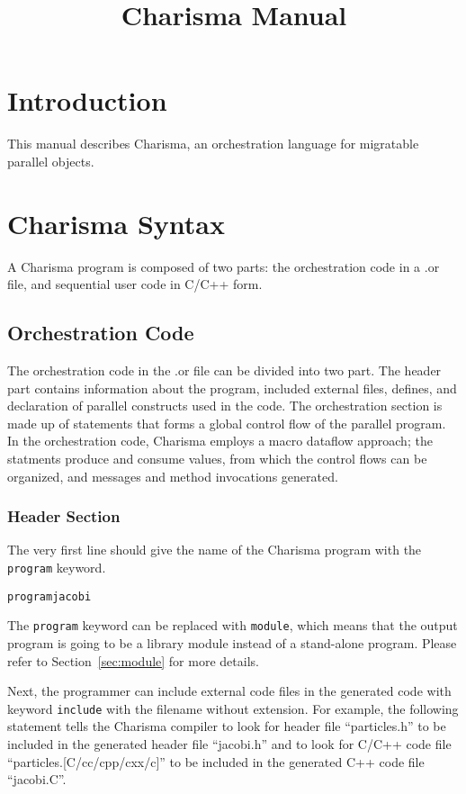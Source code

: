 \documentclass[10pt]{article}
\title{Charisma Manual}
\begin{document}
\maketitle

\section{Introduction}

This manual describes Charisma, an orchestration language for migratable
parallel objects. 

\section{Charisma Syntax}
A Charisma program is composed of two parts: the orchestration code in a .or
file, and sequential user code in C/C++ form. 

\subsection{Orchestration Code}
The orchestration code in the .or file can be divided into two part. The header
part contains information about the program, included external files, defines,
and declaration of parallel constructs used in the code. The orchestration
section is made up of statements that forms a global control flow of the
parallel program. In the orchestration code, Charisma employs a macro dataflow
approach; the statments produce and consume values, from which the control flows
can be organized, and messages and method invocations generated. 

\subsubsection{Header Section}

The very first line should give the name of the Charisma program with the {\tt
program} keyword.

\begin{alltt}
    program jacobi 
\end{alltt}

The {\tt program} keyword can be replaced with {\tt module}, which means that
the output program is going to be a library module instead of a stand-alone
program. Please refer to Section~\ref{sec:module} for more details.

Next, the programmer can include external code files in the generated code with
keyword {\tt include} with the filename without extension. For example, the
following statement tells the Charisma compiler to look for header file
``particles.h'' to be included in the generated header file ``jacobi.h'' and to
look for C/C++ code file ``particles.[C/cc/cpp/cxx/c]'' to be included in the
generated C++ code file ``jacobi.C''.
\end{document}
